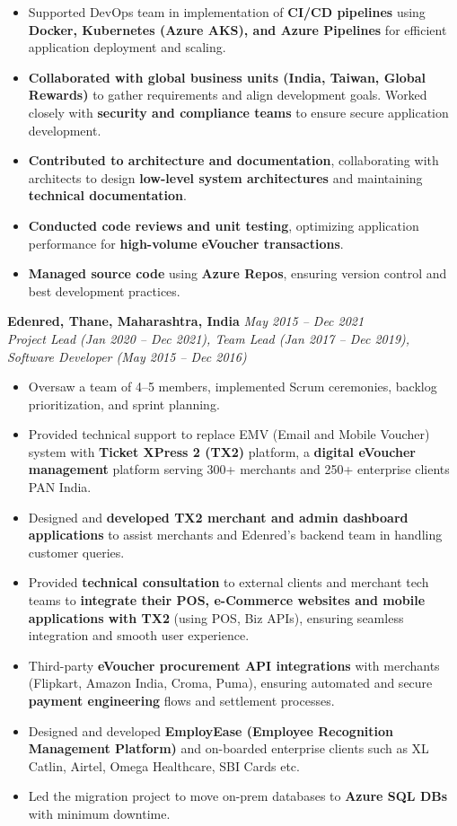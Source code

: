 \documentclass[12pt,a4paper]{article}
\begin{document}
\begin{itemize}
    \item Supported DevOps team in implementation of \textbf{CI/CD pipelines} using \textbf{Docker, Kubernetes (Azure AKS), and Azure Pipelines} for efficient application deployment and scaling. 
    \item \textbf{Collaborated with global business units (India, Taiwan, Global Rewards)} to gather requirements and align development goals. Worked closely with \textbf{security and compliance teams} to ensure secure application development. 
    \item \textbf{Contributed to architecture and documentation}, collaborating with architects to design \textbf{low-level system architectures} and maintaining \textbf{technical documentation}. 
    \item \textbf{Conducted code reviews and unit testing}, optimizing application performance for \textbf{high-volume eVoucher transactions}. 
    \item \textbf{Managed source code} using \textbf{Azure Repos}, ensuring version control and best development practices. 
\end{itemize}

\textbf{Edenred, Thane, Maharashtra, India} \hfill \textit{May 2015 -- Dec 2021}\\
\textit{Project Lead (Jan 2020 -- Dec 2021), \newline Team Lead (Jan 2017 -- Dec 2019), \newline Software Developer (May 2015 -- Dec 2016)}
\begin{itemize}
    \item Oversaw a team of 4--5 members, implemented Scrum ceremonies, backlog prioritization, and sprint planning.
    \item Provided technical support to replace EMV (Email and Mobile Voucher) system with \textbf{Ticket XPress 2 (TX2)} platform, a \textbf{digital eVoucher management} platform serving 300+ merchants and 250+ enterprise clients PAN India.
    \item Designed and \textbf{developed TX2 merchant and admin dashboard applications} to assist merchants and Edenred’s backend team in handling customer queries.
    \item Provided \textbf{technical consultation} to external clients and merchant tech teams to \textbf{integrate their POS, e-Commerce websites and mobile applications with TX2} (using POS, Biz APIs), ensuring seamless integration and smooth user experience.
    \item Third-party \textbf{eVoucher procurement API integrations} with merchants (Flipkart, Amazon India, Croma, Puma), ensuring automated and secure \textbf{payment engineering} flows and settlement processes.
    \item Designed and developed \textbf{EmployEase (Employee Recognition Management Platform)} and on-boarded enterprise clients such as XL Catlin, Airtel, Omega Healthcare, SBI Cards etc. 
    \item Led the migration project to move on-prem databases to \textbf{Azure SQL DBs} with minimum downtime.
\end{itemize}
\end{document}
